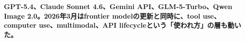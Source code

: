 \noindent\textbf{GPT-5.4、Claude Sonnet 4.6、Gemini API、GLM-5-Turbo、Qwen Image 2.0。2026年3月はfrontier modelの更新と同時に、tool use、computer use、multimodal、API lifecycleという「使われ方」の層も動いた。}\autocite{src-9156c37fb1c2,src-a24fd97eb3d0,src-eac8dfbeb78c,src-eea6230f612a,src-f6aa679babd7}
